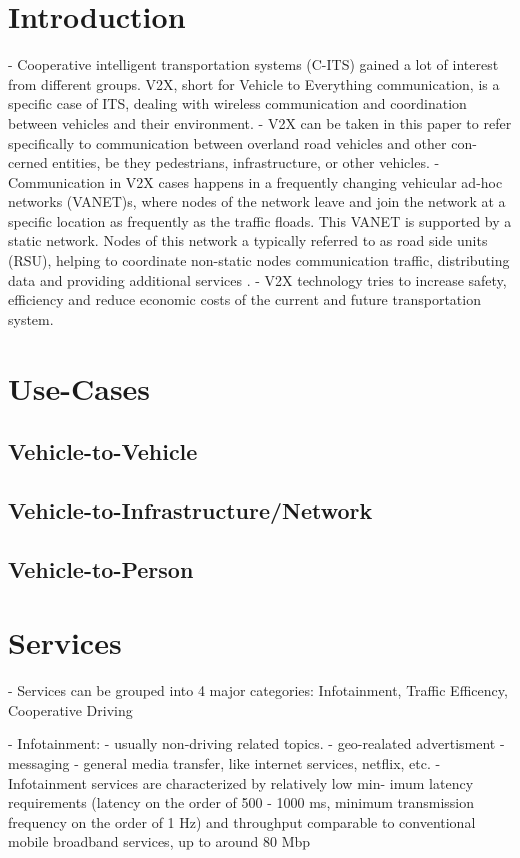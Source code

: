 \documentclass[conference,12pt,onecolumn]{IEEEtran}
\begin{document}
\section{Introduction}
- Cooperative intelligent transportation systems (C-ITS) gained a lot of interest from different groups. V2X, short for Vehicle to Everything communication, is a specific case of ITS, dealing with wireless communication and coordination between vehicles and their environment.
- V2X can be taken in this paper to refer specifically to communication between overland road vehicles and other con- cerned entities, be they pedestrians, infrastructure, or other vehicles. \cite{machardy2018}
- Communication in V2X cases happens in a frequently changing vehicular ad-hoc networks (VANET)s, where nodes of the network leave and join the network at a specific location as frequently as the traffic floads. This VANET is supported by a static network. Nodes of this network a typically referred to as road side units (RSU), helping to coordinate non-static nodes communication traffic, distributing data and providing additional services \cite{machardy2018}.
- V2X technology tries to increase safety, efficiency and reduce economic costs of the current and future transportation system. \cite{machardy2018}

\section{Use-Cases}
\subsection{Vehicle-to-Vehicle}
\subsection{Vehicle-to-Infrastructure/Network}
\subsection{Vehicle-to-Person}

\section{Services}
- Services can be grouped into 4 major categories: Infotainment, Traffic Efficency, Cooperative Driving \cite{machardy2018}

- Infotainment:
- usually non-driving related topics.
- geo-realated advertisment
- messaging
- general media transfer, like internet services, netflix, etc.
- Infotainment services are characterized by relatively low min- imum latency requirements (latency on the order of 500 - 1000 ms, minimum transmission frequency on the order of 1 Hz) and throughput comparable to conventional mobile broadband services, up to around 80 Mbp \cite{machardy2018}
\end{document}
